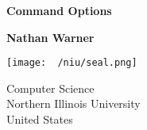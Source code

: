 \documentclass{report}
\title{\Huge{}}
\author{\huge{Nathan Warner}}
\date{\huge{}}
\begin{document}
        \begin{titlepage}
       \begin{center}
           \vspace*{1cm}
    
           \textbf{Command Options}
    
           \vspace{0.5cm}
            
                
           \vspace{1.5cm}
    
           \textbf{Nathan Warner}
    
           \vfill
                
                
           \vspace{0.8cm}
         
           \texttt{[image: ~/niu/seal.png]}
                
           Computer Science \\
           Northern Illinois University\\
           United States\\
           
                
       \end{center}
    \end{titlepage}
    \tableofcontents
    \pagebreak 
\end{document}
